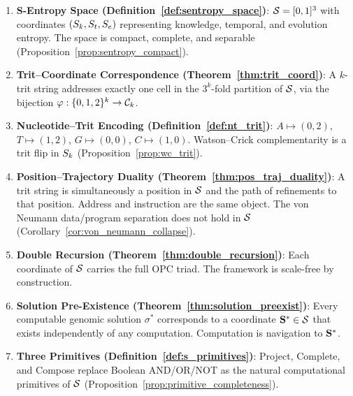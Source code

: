 \begin{chapterbox}[title=Chapter 4 --- Key Results Established]
\begin{enumerate}[label=\textbf{\arabic*.}]
  \item \textbf{S-Entropy Space (Definition~\ref{def:sentropy_space})}:
        $\mathcal{S} = [0,1]^3$ with coordinates $(S_k, S_t, S_e)$ representing
        knowledge, temporal, and evolution entropy. The space is compact,
        complete, and separable (Proposition~\ref{prop:sentropy_compact}).

  \item \textbf{Trit--Coordinate Correspondence (Theorem~\ref{thm:trit_coord})}:
        A $k$-trit string addresses exactly one cell in the $3^k$-fold partition
        of $\mathcal{S}$, via the bijection $\varphi: \{0,1,2\}^k \to \mathcal{C}_k$.

  \item \textbf{Nucleotide--Trit Encoding (Definition~\ref{def:nt_trit})}:
        $A \mapsto (0,2)$, $T \mapsto (1,2)$, $G \mapsto (0,0)$, $C \mapsto (1,0)$.
        Watson--Crick complementarity is a trit flip in $S_k$
        (Proposition~\ref{prop:wc_trit}).

  \item \textbf{Position--Trajectory Duality (Theorem~\ref{thm:pos_traj_duality})}:
        A trit string is simultaneously a position in $\mathcal{S}$ and the path
        of refinements to that position. Address and instruction are the same
        object. The von Neumann data/program separation does not hold in
        $\mathcal{S}$ (Corollary~\ref{cor:von_neumann_collapse}).

  \item \textbf{Double Recursion (Theorem~\ref{thm:double_recursion})}:
        Each coordinate of $\mathcal{S}$ carries the full OPC triad. The framework
        is scale-free by construction.

  \item \textbf{Solution Pre-Existence (Theorem~\ref{thm:solution_preexist})}:
        Every computable genomic solution $\sigma^*$ corresponds to a coordinate
        $\mathbf{S}^* \in \mathcal{S}$ that exists independently of any computation.
        Computation is navigation to $\mathbf{S}^*$.

  \item \textbf{Three Primitives (Definition~\ref{def:s_primitives})}:
        Project, Complete, and Compose replace Boolean AND/OR/NOT as the
        natural computational primitives of $\mathcal{S}$
        (Proposition~\ref{prop:primitive_completeness}).


\end{enumerate}
\end{chapterbox}
